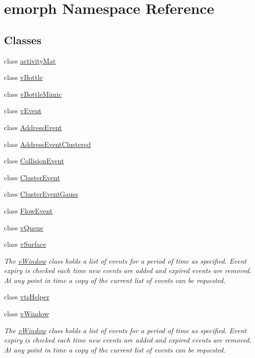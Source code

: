 \hypertarget{namespaceemorph}{\section{emorph Namespace Reference}
\label{namespaceemorph}
}
\subsection*{Classes}
\begin{DoxyCompactItemize}
\item 
class \hyperlink{classemorph_1_1activityMat}{activity\-Mat}
\item 
class \hyperlink{classemorph_1_1vBottle}{v\-Bottle}
\item 
class \hyperlink{classemorph_1_1vBottleMimic}{v\-Bottle\-Mimic}
\item 
class \hyperlink{classemorph_1_1vEvent}{v\-Event}
\item 
class \hyperlink{classemorph_1_1AddressEvent}{Address\-Event}
\item 
class \hyperlink{classemorph_1_1AddressEventClustered}{Address\-Event\-Clustered}
\item 
class \hyperlink{classemorph_1_1CollisionEvent}{Collision\-Event}
\item 
class \hyperlink{classemorph_1_1ClusterEvent}{Cluster\-Event}
\item 
class \hyperlink{classemorph_1_1ClusterEventGauss}{Cluster\-Event\-Gauss}
\item 
class \hyperlink{classemorph_1_1FlowEvent}{Flow\-Event}
\item 
class \hyperlink{classemorph_1_1vQueue}{v\-Queue}
\item 
class \hyperlink{classemorph_1_1vSurface}{v\-Surface}
\begin{DoxyCompactList}\small\item\em The \hyperlink{classemorph_1_1vWindow}{v\-Window} class holds a list of events for a period of time as specified. Event expiry is checked each time new events are added and expired events are removed. At any point in time a copy of the current list of events can be requested. \end{DoxyCompactList}\item 
class \hyperlink{classemorph_1_1vtsHelper}{vts\-Helper}
\item 
class \hyperlink{classemorph_1_1vWindow}{v\-Window}
\begin{DoxyCompactList}\small\item\em The \hyperlink{classemorph_1_1vWindow}{v\-Window} class holds a list of events for a period of time as specified. Event expiry is checked each time new events are added and expired events are removed. At any point in time a copy of the current list of events can be requested. \end{DoxyCompactList}\item 

\end{DoxyCompactItemize}
